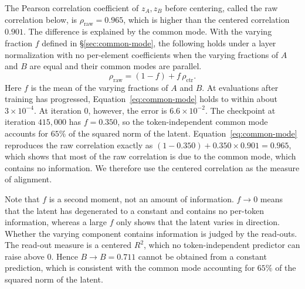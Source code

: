 \documentclass[conference]{IEEEtran}
\newcommand{\Rsq}{R^2}
\begin{document}
The Pearson correlation coefficient of $z_A,z_B$ before centering, called the raw correlation below, is $\rho_{\mathrm{raw}}=0.965$,
which is higher than the centered correlation $0.901$.
The difference is explained by the common mode. With the varying fraction $f$ defined in \S\ref{sec:common-mode}, the following holds
under a layer normalization with no per-element coefficients when the varying fractions of $A$ and $B$ are equal and their common
modes are parallel.
\begin{equation}\label{eq:common-mode}
\rho_{\mathrm{raw}} = (1-f)+f\,\rho_{\mathrm{ctr}}.
\end{equation}
Here $f$ is the mean of the varying fractions of $A$ and $B$. At evaluations after training has progressed,
Equation~\eqref{eq:common-mode} holds to within about $3\!\times\!10^{-4}$. At iteration $0$, however, the error is $6.6\!\times\!10^{-2}$.
The checkpoint at iteration $415{,}000$ has $f=0.350$, so the token-independent common mode accounts for $65\%$ of the squared norm of the latent.
Equation~\eqref{eq:common-mode} reproduces the raw correlation exactly as $(1{-}0.350)+0.350\times0.901=0.965$, which shows that most of
the raw correlation is due to the common mode, which contains no information.
We therefore use the centered correlation as the measure of alignment.

Note that $f$ is a second moment, not an amount of information. $f\!\to\!0$ means that the latent has degenerated to a constant and
contains no per-token information, whereas a large $f$ only shows that the latent varies in direction. Whether the varying component
contains information is judged by the read-outs.
The read-out measure is a centered $\Rsq$, which no token-independent predictor can raise above $0$. Hence $B\!\to\!B=0.711$ cannot be
obtained from a constant prediction, which is consistent with the common mode accounting for $65\%$ of the squared norm of the latent.
\end{document}
